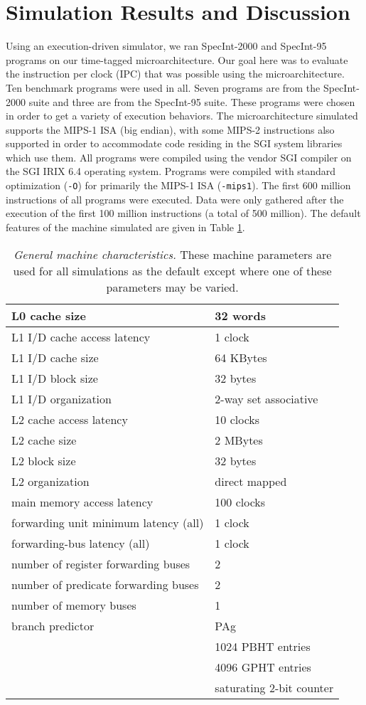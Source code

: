 \documentclass[10pt,dvips]{article}
\begin{document}
\section{Simulation Results and Discussion}
%
Using an execution-driven simulator, we ran
SpecInt-2000 and SpecInt-95 programs on our
time-tagged microarchitecture.  
Our goal here was to evaluate
the instruction per clock (IPC) that was possible using
the microarchitecture.
Ten benchmark programs were used
in all.  
Seven programs are from the SpecInt-2000 suite and
three are from the SpecInt-95 suite.  
These programs were
chosen in order to get a variety of execution behaviors.
The microarchitecture simulated supports 
the MIPS-1 ISA (big endian), with some MIPS-2
instructions also supported in order to accommodate code residing in
the SGI system libraries which use them.
All programs were compiled using the vendor SGI compiler on
the SGI IRIX 6.4 operating system.
Programs were compiled with
standard optimization ({\tt -O}) for primarily the MIPS-1 ISA ({\tt -mips1}).
The first 600 million instructions of all programs were
executed.  Data were only gathered after the execution of
the first 100 million instructions (a total of 500 million).
The default features of the machine simulated are
given in Table \ref{tab:params}.
%
\begin{table}
\begin{center}
\caption{{\em General machine characteristics.}
These machine parameters are used for all simulations as
the default except where one of these parameters may be varied.}
\label{tab:params}
\begin{tabular}{|l|l|}
\hline 
L0 cache size&32 words\\
\hline 
L1 I/D cache access latency&1 clock\\
\hline
L1 I/D cache size&64 KBytes\\
\hline
L1 I/D block size&32 bytes\\
\hline
L1 I/D organization&2-way set associative\\
\hline
L2 cache access latency&10 clocks\\
\hline
L2 cache size&2 MBytes\\
\hline
L2 block size&32 bytes\\
\hline
L2 organization&direct mapped\\
\hline
main memory access latency&100 clocks\\
\hline
forwarding unit minimum latency (all)&1 clock\\
\hline
forwarding-bus latency (all)&1 clock\\
\hline
number of register forwarding buses&2\\
\hline
number of predicate forwarding buses&2\\
\hline
number of memory buses&1\\
\hline
branch predictor&PAg\\
\cline{2-2}
 & 1024 PBHT entries\\
\cline{2-2}
 & 4096 GPHT entries\\
\cline{2-2}
 & saturating 2-bit counter\\
\hline
\end{tabular}
\end{center}
\end{table}
\end{document}

